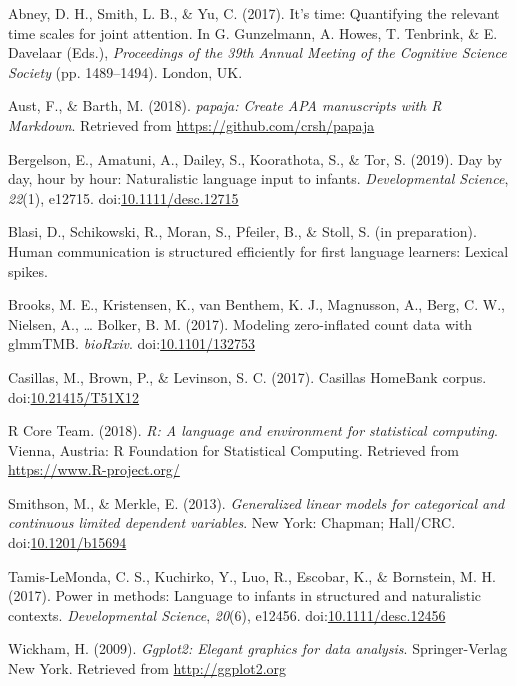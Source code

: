 \documentclass[,man,floatsintext]{apa6}
\begin{document}
\hypertarget{refs}{}
\hypertarget{ref-abney2017time}{}
Abney, D. H., Smith, L. B., \& Yu, C. (2017). It's time: Quantifying the
relevant time scales for joint attention. In G. Gunzelmann, A. Howes, T.
Tenbrink, \& E. Davelaar (Eds.), \emph{Proceedings of the 39th Annual
Meeting of the Cognitive Science Society} (pp. 1489--1494). London, UK.

\hypertarget{ref-R-papaja}{}
Aust, F., \& Barth, M. (2018). \emph{papaja: Create APA manuscripts with
R Markdown}. Retrieved from \url{https://github.com/crsh/papaja}

\hypertarget{ref-bergelson2019day}{}
Bergelson, E., Amatuni, A., Dailey, S., Koorathota, S., \& Tor, S.
(2019). Day by day, hour by hour: Naturalistic language input to
infants. \emph{Developmental Science}, \emph{22}(1), e12715.
doi:\href{https://doi.org/10.1111/desc.12715}{10.1111/desc.12715}

\hypertarget{ref-blasiIPhuman}{}
Blasi, D., Schikowski, R., Moran, S., Pfeiler, B., \& Stoll, S. (in
preparation). Human communication is structured efficiently for first
language learners: Lexical spikes.

\hypertarget{ref-brooks2017modeling}{}
Brooks, M. E., Kristensen, K., van Benthem, K. J., Magnusson, A., Berg,
C. W., Nielsen, A., \ldots{} Bolker, B. M. (2017). Modeling
zero-inflated count data with glmmTMB. \emph{bioRxiv}.
doi:\href{https://doi.org/10.1101/132753}{10.1101/132753}

\hypertarget{ref-Casillas-HB}{}
Casillas, M., Brown, P., \& Levinson, S. C. (2017). Casillas HomeBank
corpus. doi:\href{https://doi.org/10.21415/T51X12}{10.21415/T51X12}

\hypertarget{ref-R-base}{}
R Core Team. (2018). \emph{R: A language and environment for statistical
computing}. Vienna, Austria: R Foundation for Statistical Computing.
Retrieved from \url{https://www.R-project.org/}

\hypertarget{ref-smithson2013generalized}{}
Smithson, M., \& Merkle, E. (2013). \emph{Generalized linear models for
categorical and continuous limited dependent variables}. New York:
Chapman; Hall/CRC.
doi:\href{https://doi.org/10.1201/b15694}{10.1201/b15694}

\hypertarget{ref-tamislemonda2017power}{}
Tamis-LeMonda, C. S., Kuchirko, Y., Luo, R., Escobar, K., \& Bornstein,
M. H. (2017). Power in methods: Language to infants in structured and
naturalistic contexts. \emph{Developmental Science}, \emph{20}(6),
e12456.
doi:\href{https://doi.org/10.1111/desc.12456}{10.1111/desc.12456}

\hypertarget{ref-R-ggplot2}{}
Wickham, H. (2009). \emph{Ggplot2: Elegant graphics for data analysis}.
Springer-Verlag New York. Retrieved from \url{http://ggplot2.org}

\endgroup
\end{document}
